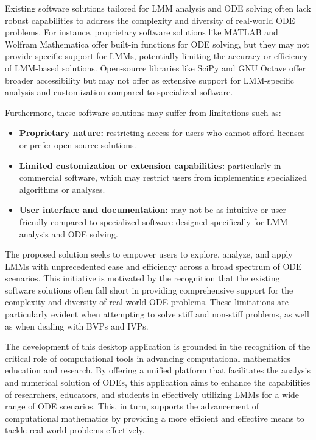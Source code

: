 Existing software solutions tailored for LMM analysis and ODE solving often lack robust capabilities to address the complexity and diversity of real-world ODE problems. For instance, proprietary software solutions like MATLAB and Wolfram Mathematica offer built-in functions for ODE solving, but they may not provide specific support for LMMs, potentially limiting the accuracy or efficiency of LMM-based solutions. Open-source libraries like SciPy and GNU Octave offer broader accessibility but may not offer as extensive support for LMM-specific analysis and customization compared to specialized software.

Furthermore, these software solutions may suffer from limitations such as:

\begin{itemize}
    \item \textbf{Proprietary nature:} restricting access for users who cannot afford licenses or prefer open-source solutions.
    \item \textbf{Limited customization or extension capabilities:} particularly in commercial software, which may restrict users from implementing specialized algorithms or analyses.
    \item \textbf{User interface and documentation:} may not be as intuitive or user-friendly compared to specialized software designed specifically for LMM analysis and ODE solving.
\end{itemize}

The proposed solution seeks to empower users to explore, analyze, and apply LMMs with unprecedented ease and efficiency across a broad spectrum of ODE scenarios. This initiative is motivated by the recognition that the existing software solutions often fall short in providing comprehensive support for the complexity and diversity of real-world ODE problems. These limitations are particularly evident when attempting to solve stiff and non-stiff problems, as well as when dealing with BVPs and IVPs.

The development of this desktop application is grounded in the recognition of the critical role of computational tools in advancing computational mathematics education and research. By offering a unified platform that facilitates the analysis and numerical solution of ODEs, this application aims to enhance the capabilities of researchers, educators, and students in effectively utilizing LMMs for a wide range of ODE scenarios. This, in turn, supports the advancement of computational mathematics by providing a more efficient and effective means to tackle real-world problems effectively.

